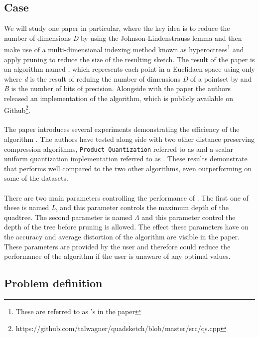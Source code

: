 \subsection{Case} %
We will study one paper in particular, where the key idea is to reduce the number of dimensions \textit{D} by using the Johnson-Lindenstrauss lemma and then make use of a multi-dimensional indexing method known as hyperoctrees\footnote{These are referred to as \qt{}'s in the paper} and apply pruning to reduce the size of the resulting sketch. The result of the paper is an algorithm named \qs{}, which represents each point in a Euclidaen space using only  where \textit{d} is the result of reduing the number of dimensions \textit{D} of a pointset by  and \textit{B} is the number of bits of precision. Alongside with the paper the authors released an implementation of the algorithm, which is publicly available on Github\footnote{https://github.com/talwagner/quadsketch/blob/master/src/qs.cpp}. 
\\
\\
The paper introduces several experiments demonstrating the efficiency of the algorithm \qs{}. The authors have tested \qs{} along side with two other distance preserving compression algorithms, \texttt{Product Quantization} referred to as \pq{} and a scalar uniform quantization implementation referred to as \gr{}. These results demonstrate that \qs{} performs well compared to the two other algorithms, even outperforming \pq{} on some of the datasets. 
\\
\\
There are two main parameters controlling the performance of \qs{}. The first one of these is named \textit{L}, and this parameter controls the maximum depth of the quadtree. The second parameter is named $\Lambda$ and this parameter control the depth of the tree before pruning is allowed. The effect these parameters have on the accuracy and average distortion of the algorithm are visible in the paper. These parameters are provided by the user and therefore could reduce the performance of the algorithm if the user is unaware of any optimal values.
\subsection{Problem definition} %
